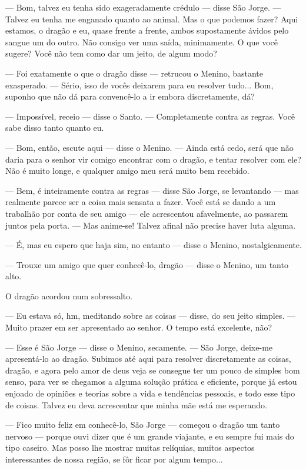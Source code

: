 — Bom, talvez eu tenha sido exageradamente crédulo — disse São Jorge.
— Talvez eu tenha me enganado quanto ao animal. Mas o que podemos
fazer? Aqui estamos, o dragão e eu, quase frente a frente, ambos
supostamente ávidos pelo sangue um do outro. Não consigo ver uma
saída, minimamente. O que você sugere? Você não tem como dar um
jeito, de algum modo?

— Foi exatamente o que o dragão disse — retrucou o Menino, bastante
exasperado. — Sério, isso de vocês deixarem para eu resolver tudo...
Bom, suponho que não dá para convencê-lo a ir embora discretamente,
dá?

— Impossível, receio — disse o Santo. — Completamente contra as
regras. Você sabe disso tanto quanto eu. 

— Bom, então, escute aqui — disse o Menino. — Ainda está cedo, será
que não daria para o senhor vir comigo encontrar com o dragão, e
tentar resolver com ele? Não é muito longe, e qualquer amigo meu será
muito bem recebido. 

— Bem, é inteiramente contra as regras — disse São Jorge, se
levantando — mas realmente parece ser a coisa mais sensata a fazer.
Você está se dando a um trabalhão por conta de seu amigo — ele
acrescentou afavelmente, ao passarem juntos pela porta. — Mas
anime-se! Talvez afinal não precise haver luta alguma.

— É, mas eu espero que haja sim, no entanto — disse o Menino,
nostalgicamente. 


\bigskip

— Trouxe um amigo que quer conhecê-lo, dragão — disse o Menino, um
tanto alto.

O dragão acordou num sobressalto.

— Eu estava só, hm, meditando sobre as coisas — disse, do seu jeito
simples. — Muito prazer em ser apresentado ao senhor. O tempo está
excelente, não?

— Esse é São Jorge — disse o Menino, secamente. — São Jorge, deixe-me
apresentá-lo ao dragão. Subimos até aqui para resolver discretamente
as coisas, dragão, e agora pelo amor de deus veja se consegue ter um
pouco de simples bom senso, para ver se chegamos a alguma solução
prática e eficiente, porque já estou enjoado de opiniões e teorias
sobre a vida e tendências pessoais, e todo esse tipo de coisas.
Talvez eu deva acrescentar que minha mãe está me esperando.

— Fico muito feliz em conhecê-lo, São Jorge — começou o dragão um
tanto nervoso — porque ouvi dizer que é um grande viajante, e eu
sempre fui mais do tipo caseiro. Mas posso lhe mostrar muitas
relíquias, muitos aspectos interessantes de nossa região, se fôr
ficar por algum tempo...

